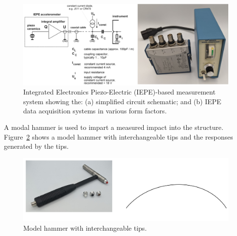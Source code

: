 \documentclass[12pt,letter]{article}
\begin{document}


\begin{figure}[H]
    \centering
    \includegraphics[width=6.5in]{../figures/IEPE.png}
    \caption{Integrated Electronics Piezo-Electric (IEPE)-based measurement system showing the: (a) simplified circuit schematic\protect\footnotemark[1]; and (b) IEPE data acquisition systems in various form factors.}
    \label{fig:IEPE}
\end{figure} 


A modal hammer is used to impart a measured impact into the structure. Figure~\ref{fig:modal_hammer} shows a model hammer with interchangeable tips and the responses generated by the tips. 

\begin{figure}[H]
	\centering
	\includegraphics[width=6.5in]{../figures/modal_hammer.png}
	\caption{Model hammer with interchangeable tips.}
	\label{fig:modal_hammer}
\end{figure} 






\pagebreak
\end{document}
